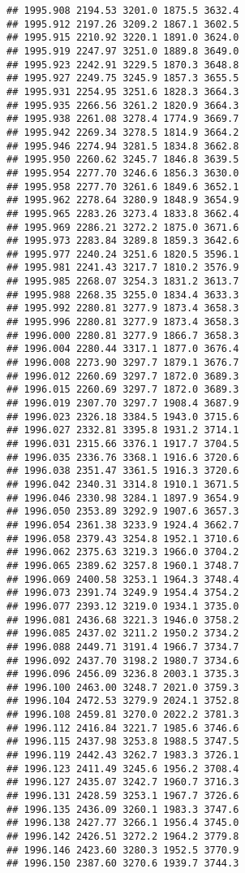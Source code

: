 \documentclass[
]{article}
\begin{document}
\begin{verbatim}
## 1995.908 2194.53 3201.0 1875.5 3632.4
## 1995.912 2197.26 3209.2 1867.1 3602.5
## 1995.915 2210.92 3220.1 1891.0 3624.0
## 1995.919 2247.97 3251.0 1889.8 3649.0
## 1995.923 2242.91 3229.5 1870.3 3648.8
## 1995.927 2249.75 3245.9 1857.3 3655.5
## 1995.931 2254.95 3251.6 1828.3 3664.3
## 1995.935 2266.56 3261.2 1820.9 3664.3
## 1995.938 2261.08 3278.4 1774.9 3669.7
## 1995.942 2269.34 3278.5 1814.9 3664.2
## 1995.946 2274.94 3281.5 1834.8 3662.8
## 1995.950 2260.62 3245.7 1846.8 3639.5
## 1995.954 2277.70 3246.6 1856.3 3630.0
## 1995.958 2277.70 3261.6 1849.6 3652.1
## 1995.962 2278.64 3280.9 1848.9 3654.9
## 1995.965 2283.26 3273.4 1833.8 3662.4
## 1995.969 2286.21 3272.2 1875.0 3671.6
## 1995.973 2283.84 3289.8 1859.3 3642.6
## 1995.977 2240.24 3251.6 1820.5 3596.1
## 1995.981 2241.43 3217.7 1810.2 3576.9
## 1995.985 2268.07 3254.3 1831.2 3613.7
## 1995.988 2268.35 3255.0 1834.4 3633.3
## 1995.992 2280.81 3277.9 1873.4 3658.3
## 1995.996 2280.81 3277.9 1873.4 3658.3
## 1996.000 2280.81 3277.9 1866.7 3658.3
## 1996.004 2280.44 3317.1 1877.0 3676.4
## 1996.008 2273.90 3297.7 1879.1 3676.7
## 1996.012 2260.69 3297.7 1872.0 3689.3
## 1996.015 2260.69 3297.7 1872.0 3689.3
## 1996.019 2307.70 3297.7 1908.4 3687.9
## 1996.023 2326.18 3384.5 1943.0 3715.6
## 1996.027 2332.81 3395.8 1931.2 3714.1
## 1996.031 2315.66 3376.1 1917.7 3704.5
## 1996.035 2336.76 3368.1 1916.6 3720.6
## 1996.038 2351.47 3361.5 1916.3 3720.6
## 1996.042 2340.31 3314.8 1910.1 3671.5
## 1996.046 2330.98 3284.1 1897.9 3654.9
## 1996.050 2353.89 3292.9 1907.6 3657.3
## 1996.054 2361.38 3233.9 1924.4 3662.7
## 1996.058 2379.43 3254.8 1952.1 3710.6
## 1996.062 2375.63 3219.3 1966.0 3704.2
## 1996.065 2389.62 3257.8 1960.1 3748.7
## 1996.069 2400.58 3253.1 1964.3 3748.4
## 1996.073 2391.74 3249.9 1954.4 3754.2
## 1996.077 2393.12 3219.0 1934.1 3735.0
## 1996.081 2436.68 3221.3 1946.0 3758.2
## 1996.085 2437.02 3211.2 1950.2 3734.2
## 1996.088 2449.71 3191.4 1966.7 3734.7
## 1996.092 2437.70 3198.2 1980.7 3734.6
## 1996.096 2456.09 3236.8 2003.1 3735.3
## 1996.100 2463.00 3248.7 2021.0 3759.3
## 1996.104 2472.53 3279.9 2024.1 3752.8
## 1996.108 2459.81 3270.0 2022.2 3781.3
## 1996.112 2416.84 3221.7 1985.6 3746.6
## 1996.115 2437.98 3253.8 1988.5 3747.5
## 1996.119 2442.43 3262.7 1983.3 3726.1
## 1996.123 2411.49 3245.6 1956.2 3708.4
## 1996.127 2435.07 3242.7 1960.7 3716.3
## 1996.131 2428.59 3253.1 1967.7 3726.6
## 1996.135 2436.09 3260.1 1983.3 3747.6
## 1996.138 2427.77 3266.1 1956.4 3745.0
## 1996.142 2426.51 3272.2 1964.2 3779.8
## 1996.146 2423.60 3280.3 1952.5 3770.9
## 1996.150 2387.60 3270.6 1939.7 3744.3

\end{verbatim}
\end{document}
